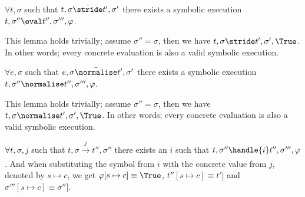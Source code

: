 \begin{lemma}
  $\forall t,\sigma$ such that $t,\sigma \bar{\stride}t',\sigma'$
  there exists a symbolic execution $t,\sigma''\eval t'',\sigma''',\phi$.
\end{lemma}

This lemma holds trivially; assume $\sigma''=\sigma$, then we have $t,\sigma\stride t',\sigma',\True$. In other words; every concrete evaluation is also a valid symbolic execution.

\begin{lemma}
  $\forall e,\sigma$ such that $e,\sigma \bar{\normalise}t',\sigma'$
  there exists a symbolic execution $t,\sigma''\normalise t'',\sigma''',\phi$.
\end{lemma}

This lemma holds trivially; assume $\sigma''=\sigma$, then we have $t,\sigma\normalise t',\sigma',\True$. In other words; every concrete evaluation is also a valid symbolic execution.

\begin{lemma}
  $\forall t,\sigma,j$ such that $t,\sigma \xrightarrow[]{j} t'',\sigma''$
  there exists an $i$ such that $t,\sigma''\handle{i} t'',\sigma''',\phi$. And when substituting the symbol from $i$ with the concrete value from $j$, denoted by $s\mapsto c$, we get $\phi[s\mapsto c]\equiv\True$, $t''[s\mapsto c]\equiv t']$ and $\sigma'''[s\mapsto c]\equiv\sigma'']$.
\end{lemma}

\begin{lemma}
\end{lemma}
